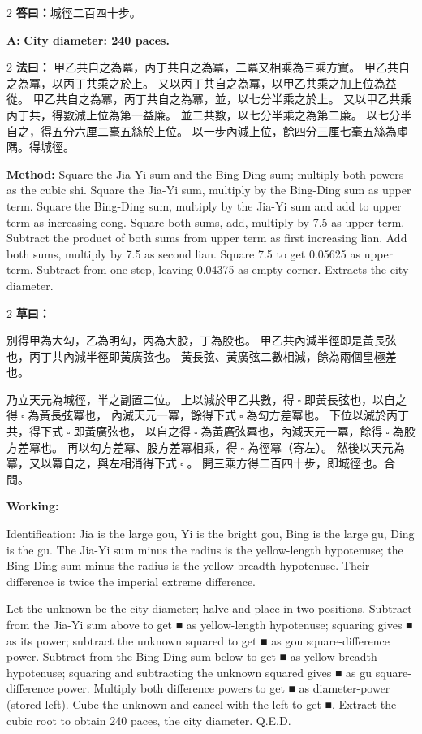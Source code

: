 \documentclass[11pt,a4paper]{article}
\let\origsquare\square
\renewcommand{\square}{\ensuremath{\origsquare}}%
\newcommand{\fayue}[1]{%
  \noindent\textcolor{methodcolor}{\textbf{法曰：}}{\tradfont #1}\par\nopagebreak%
}
\newcommand{\fayueeng}[1]{%
  \noindent\textcolor{engcolor}{\textbf{Method: }}{#1}\par\nopagebreak%
}
\newcommand{\tsaoyue}[1]{%
  \noindent\textcolor{workcolor}{\textbf{草曰：}}{\tradfont #1}\par%
}
\newcommand{\tsaoyueeng}[1]{%
  \noindent\textcolor{engcolor}{\textbf{Working: }}{\small #1}\par%
}
\newcommand{\dayue}[1]{%
  \noindent\textcolor{anscolor}{\textbf{答曰：}}{\tradfont #1}\par\nopagebreak%
}
\newcommand{\dayueeng}[1]{%
  \noindent\textcolor{engcolor}{\textbf{A: }}{\bfseries #1}\par\nopagebreak%
}
\begin{document}
\begin{paracol}{2}
\dayue{城徑二百四十步。}
\switchcolumn
\dayueeng{City diameter: 240 paces.}
\end{paracol}

\begin{paracol}{2}
\fayue{%
甲乙共自之為冪，丙丁共自之為冪，二冪又相乘為三乘方實。
甲乙共自之為冪，以丙丁共乘之於上。
又以丙丁共自之為冪，以甲乙共乘之加上位為益從。
甲乙共自之為冪，丙丁共自之為冪，並，以七分半乘之於上。
又以甲乙共乘丙丁共，得數減上位為第一益廉。
並二共數，以七分半乘之為第二廉。
以七分半自之，得五分六厘二毫五絲於上位。
以一步內減上位，餘四分三厘七毫五絲為虛隅。得城徑。}
\switchcolumn
\fayueeng{%
Square the Jia-Yi sum and the Bing-Ding sum; multiply both powers as the cubic shi. Square the Jia-Yi sum, multiply by the Bing-Ding sum as upper term. Square the Bing-Ding sum, multiply by the Jia-Yi sum and add to upper term as increasing cong. Square both sums, add, multiply by 7.5 as upper term. Subtract the product of both sums from upper term as first increasing lian. Add both sums, multiply by 7.5 as second lian. Square 7.5 to get 0.05625 as upper term. Subtract from one step, leaving 0.04375 as empty corner. Extracts the city diameter.}
\end{paracol}

\begin{paracol}{2}
\tsaoyue{%
別得甲為大勾，乙為明勾，丙為大股，丁為股也。
甲乙共內減半徑即是黃長弦也，丙丁共內減半徑即黃廣弦也。
黃長弦、黃廣弦二數相減，餘為兩個皇極差也。

乃立天元為城徑，半之副置二位。
上以減於甲乙共數，得$ \; \square \; $即黃長弦也，以自之得$ \; \square \; $為黃長弦冪也，
內減天元一冪，餘得下式$ \; \square \; $為勾方差冪也。
下位以減於丙丁共，得下式$ \; \square \; $即黃廣弦也，
以自之得$ \; \square \; $為黃廣弦冪也，內減天元一冪，餘得$ \; \square \; $為股方差冪也。
再以勾方差冪、股方差冪相乘，得$ \; \square \; $為徑冪（寄左）。
然後以天元為冪，又以冪自之，與左相消得下式$ \; \square \; $。
開三乘方得二百四十步，即城徑也。合問。}
\switchcolumn
\tsaoyueeng{%
Identification: Jia is the large gou, Yi is the bright gou, Bing is the large gu, Ding is the gu. The Jia-Yi sum minus the radius is the yellow-length hypotenuse; the Bing-Ding sum minus the radius is the yellow-breadth hypotenuse. Their difference is twice the imperial extreme difference.

Let the unknown be the city diameter; halve and place in two positions. Subtract from the Jia-Yi sum above to get ■ as yellow-length hypotenuse; squaring gives ■ as its power; subtract the unknown squared to get ■ as gou square-difference power. Subtract from the Bing-Ding sum below to get ■ as yellow-breadth hypotenuse; squaring and subtracting the unknown squared gives ■ as gu square-difference power. Multiply both difference powers to get ■ as diameter-power (stored left). Cube the unknown and cancel with the left to get ■. Extract the cubic root to obtain 240 paces, the city diameter. Q.E.D.}
\end{paracol}
\end{document}
